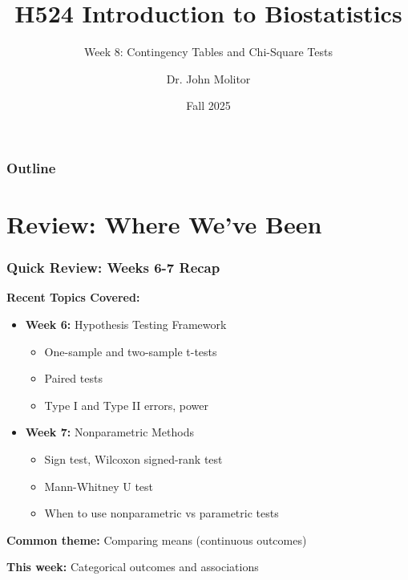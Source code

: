 \documentclass{beamer}
\title{H524 Introduction to Biostatistics}
\subtitle{Week 8: Contingency Tables and Chi-Square Tests}
\author{Dr. John Molitor}
\institute{}
\date{Fall 2025}
\begin{document}
\frame{\titlepage}

\begin{frame}
\frametitle{Outline}
\tableofcontents
\end{frame}

\section{Review: Where We've Been}

\begin{frame}
\frametitle{Quick Review: Weeks 6-7 Recap}
\textbf{Recent Topics Covered:}
\begin{itemize}
\item \textbf{Week 6:} Hypothesis Testing Framework
  \begin{itemize}
  \item One-sample and two-sample t-tests
  \item Paired tests
  \item Type I and Type II errors, power
  \end{itemize}
\item \textbf{Week 7:} Nonparametric Methods
  \begin{itemize}
  \item Sign test, Wilcoxon signed-rank test
  \item Mann-Whitney U test
  \item When to use nonparametric vs parametric tests
  \end{itemize}
\end{itemize}

\vspace{0.5cm}
\textbf{Common theme:} Comparing means (continuous outcomes)

\vspace{0.3cm}
\textbf{This week:} Categorical outcomes and associations
\end{frame}
\end{document}
